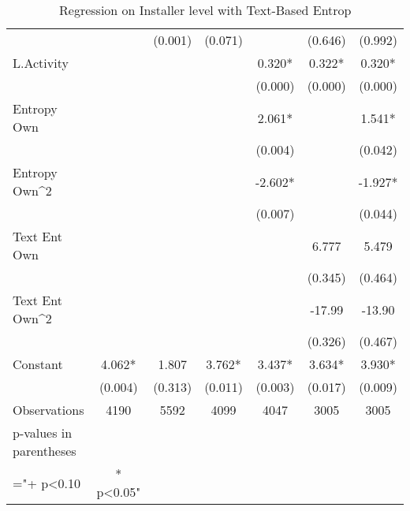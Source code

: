 \begin{table}
\begin{tabular}{@{}lcccccc@{}}
 &  & (0.001) & (0.071) &  & (0.646) & (0.992) \\
L.Activity &  &  &  & 0.320* & 0.322* & 0.320* \\
 &  &  &  & (0.000) & (0.000) & (0.000) \\
Entropy Own &  &  &  & 2.061* &  & 1.541* \\
 &  &  &  & (0.004) &  & (0.042) \\
Entropy Own\textasciicircum{}2 &  &  &  & -2.602* &  & -1.927* \\
 &  &  &  & (0.007) &  & (0.044) \\
Text Ent Own &  &  &  &  & 6.777 & 5.479 \\
 &  &  &  &  & (0.345) & (0.464) \\
Text Ent Own\textasciicircum{}2 &  &  &  &  & -17.99 & -13.90 \\
 &  &  &  &  & (0.326) & (0.467) \\
Constant & 4.062* & 1.807 & 3.762* & 3.437* & 3.634* & 3.930* \\
 & (0.004) & (0.313) & (0.011) & (0.003) & (0.017) & (0.009) \\
Observations & 4190 & 5592 & 4099 & 4047 & 3005 & 3005 \\
p-values in parentheses &  &  &  &  &  &  \\
="+ p\textless{}0.10 & * p\textless{}0.05" &  &  &  &  &  \\ \bottomrule
\end{tabular}
\caption{Regression on Installer level with Text-Based Entrop}
\label{table_reg_ind_textent}
\end{table}